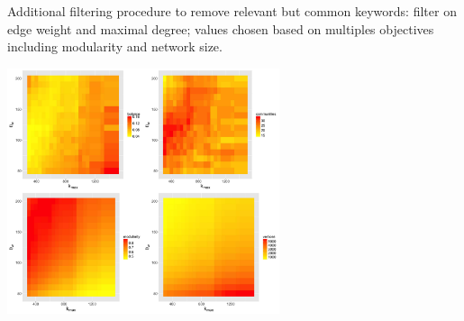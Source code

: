 {\justify

\vspace{-0.5cm}
Additional filtering procedure to remove relevant but common keywords: filter on edge weight and maximal degree; values chosen based on multiples objectives including modularity and network size.

\medskip

\centering

\includegraphics[width=0.6\textwidth]{figures/scim_Fig6.jpg}

}





